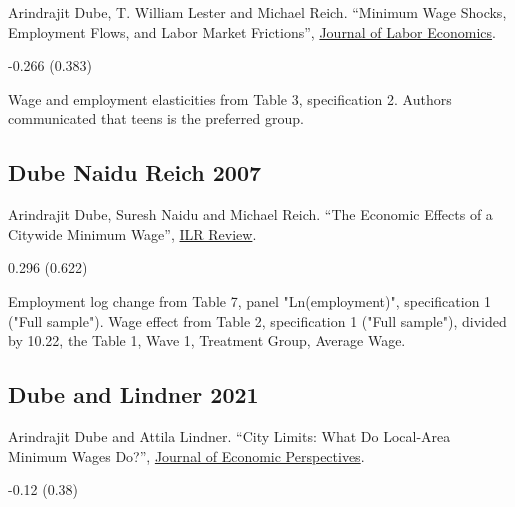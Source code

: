 \noindent Arindrajit Dube, T. William Lester and Michael Reich. ``Minimum Wage Shocks, Employment Flows, and Labor Market Frictions'', \href{https://doi.org/10.1086/685449}{Journal of Labor Economics}.

\vspace{0.7em}

 -0.266 (0.383)

\vspace{0.7em}

 Wage and employment elasticities from Table 3, specification 2. Authors communicated that teens is the preferred group.

\subsection*{Dube Naidu Reich 2007}
\vspace{-0.7em}

\noindent Arindrajit Dube, Suresh Naidu and Michael Reich. ``The Economic Effects of a Citywide Minimum Wage'', \href{https://doi.org/10.1177/001979390706000404}{ILR Review}.

\vspace{0.7em}

 0.296 (0.622)

\vspace{0.7em}

 Employment log change from Table 7, panel "Ln(employment)", specification 1 ("Full sample"). Wage effect from Table 2, specification 1 ("Full sample"), divided by 10.22, the Table 1, Wave 1, Treatment Group, Average Wage.

\subsection*{Dube and Lindner 2021}
\vspace{-0.7em}

\noindent Arindrajit Dube and Attila Lindner. ``City Limits: What Do Local-Area Minimum Wages Do?'', \href{https://doi.org/10.1257/jep.35.1.27}{Journal of Economic Perspectives}.

\vspace{0.7em}

 -0.12 (0.38)

\vspace{0.7em}

